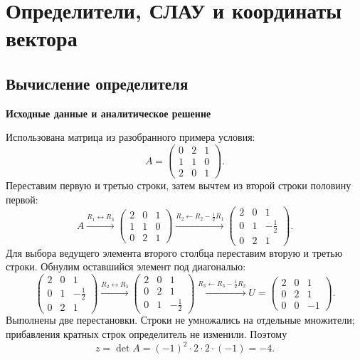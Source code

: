 \documentclass[12pt,a4paper]{article}
\newcommand{\taskhead}[1]{\par\textbf{#1}\par}
\begin{document}
\newpage

\begingroup
\setlength{\parskip}{4pt}
\setlength{\abovedisplayskip}{6pt}
\setlength{\belowdisplayskip}{6pt}
\setlength{\textfloatsep}{8pt}
\setlength{\intextsep}{8pt}
\section{Определители, СЛАУ и координаты вектора}
\subsection{Вычисление определителя}
\taskhead{Исходные данные и аналитическое решение}
Использована матрица из разобранного примера условия:
\[
A=\begin{pmatrix}0&2&1\\1&1&0\\2&0&1\end{pmatrix}.
\]
Переставим первую и третью строки, затем вычтем из второй строки
половину первой:
\[
A\xrightarrow{R_1\leftrightarrow R_3}
\begin{pmatrix}2&0&1\\1&1&0\\0&2&1\end{pmatrix}
\xrightarrow{R_2\gets R_2-\frac12R_1}
\begin{pmatrix}2&0&1\\0&1&-\frac12\\0&2&1\end{pmatrix}.
\]
Для выбора ведущего элемента второго столбца переставим вторую
и третью строки. Обнулим оставшийся элемент под диагональю:
\[
\begin{pmatrix}2&0&1\\0&1&-\frac12\\0&2&1\end{pmatrix}
\xrightarrow{R_2\leftrightarrow R_3}
\begin{pmatrix}2&0&1\\0&2&1\\0&1&-\frac12\end{pmatrix}
\xrightarrow{R_3\gets R_3-\frac12R_2}
U=\begin{pmatrix}2&0&1\\0&2&1\\0&0&-1\end{pmatrix}.
\]
Выполнены две перестановки. Строки не умножались на отдельные
множители; прибавления кратных строк определитель не изменили.
Поэтому
\[
z=\det A=(-1)^2\cdot2\cdot2\cdot(-1)=-4.
\]
\end{document}
